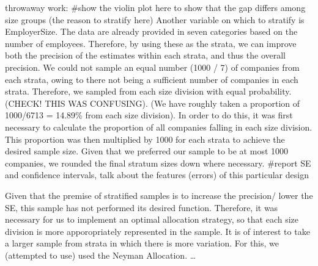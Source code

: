 \documentclass[]{article}
\begin{document}
throwaway work: \#show the violin plot here to show that the gap differs
among size groups (the reason to stratify here) Another variable on
which to stratify is EmployerSize. The data are already provided in
seven categories based on the number of employees. Therefore, by using
these as the strata, we can improve both the precision of the estimates
within each strata, and thus the overall precision. We could not sample
an equal number (1000 / 7) of companies from each strata, owing to there
not being a sufficient number of companies in each strata. Therefore, we
sampled from each size division with equal probability. (CHECK! THIS WAS
CONFUSING). (We have roughly taken a proportion of 1000/6713 = 14.89\%
from each size division). In order to do this, it was first necessary to
calculate the proportion of all companies falling in each size division.
This proportion was then multiplied by 1000 for each strata to achieve
the desired sample size. Given that we preferred our sample to be at
most 1000 companies, we rounded the final stratum sizes down where
necessary. \#report SE and confidence intervals, talk about the features
(errors) of this particular design

Given that the premise of stratified samples is to increase the
precision/ lower the SE, this sample has not performed its desired
function. Therefore, it was necessary for us to implement an optimal
allocation strategy, so that each size division is more apporopriately
represented in the sample. It is of interest to take a larger sample
from strata in which there is more variation. For this, we (attempted to
use) used the Neyman Allocation. \ldots{}
\end{document}
